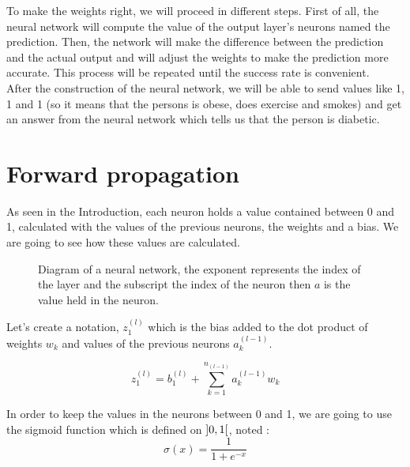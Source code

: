 \documentclass[]{report}
\begin{document}
{To make the weights right, we will proceed in different steps. First of all, the neural network will
compute the value of the output layer’s neurons named the prediction. Then, the network will make
the difference between the prediction and the actual output and will adjust the weights to make the
prediction more accurate. This process will be repeated until the success rate is convenient.}\\

{After the construction of the neural network, we will be able to send values like 1, 1 and 1 (so it means that the persons is obese, does exercise and smokes) and get an answer from the neural network which tells us that the person is diabetic.}



\section{Forward propagation}

{As seen in the Introduction, each neuron holds a value contained between 0 and 1, calculated with the values of the previous neurons, the weights and a bias. We are going to see how these values are calculated.}

\begin{figure}[H]
    \centering
    \begin{neuralnetwork}[height=4, nodespacing=15mm]
        \newcommand{\inputtext}[2]{$a^{(l-1)}_#2$}
        \newcommand{\outputtext}[2]{$a^{(l)}_#2$}
        \inputlayer[count=3, bias=false, text=\inputtext, title=Input layer]
        \outputlayer[count=1,  text=\outputtext, title=Output layer]
        \linklayers[title=Weights $w_k$]
    \end{neuralnetwork}
    \caption{Diagram of a neural network, the exponent represents the index of the layer and the subscript the index of the neuron then $a$ is the value held in the neuron.}
\end{figure}

{Let's create a notation, $z^{(l)}_1$ which is the bias added to the dot product of weights $w_k$ and values of the previous neurons $a^{(l-1)}_k$.}

\[{z^{(l)}_1=b^{(l)}_1+\sum_{k=1}^{n_{(l-1)}} a^{(l-1)}_k w_k}\]

{In order to keep the values in the neurons between 0 and 1, we are going to use the sigmoid function which is defined on $\interval[open]{0}{1}$, noted :}
\[\sigma(x)=\frac{1}{1+e^{-x}}\]
\end{document}
